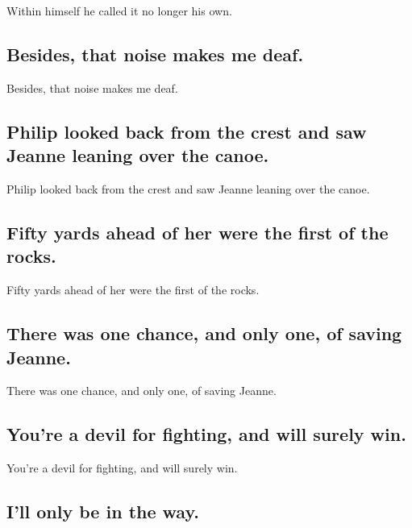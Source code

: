 \documentclass[]{article}
\begin{document}
Within himself he called it no longer his own.

\hypertarget{besides-that-noise-makes-me-deaf.}{%
\subsection{Besides, that noise makes me
deaf.}\label{besides-that-noise-makes-me-deaf.}}

Besides, that noise makes me deaf.

\hypertarget{philip-looked-back-from-the-crest-and-saw-jeanne-leaning-over-the-canoe.}{%
\subsection{Philip looked back from the crest and saw Jeanne leaning
over the
canoe.}\label{philip-looked-back-from-the-crest-and-saw-jeanne-leaning-over-the-canoe.}}

Philip looked back from the crest and saw Jeanne leaning over the canoe.

\hypertarget{fifty-yards-ahead-of-her-were-the-first-of-the-rocks.}{%
\subsection{Fifty yards ahead of her were the first of the
rocks.}\label{fifty-yards-ahead-of-her-were-the-first-of-the-rocks.}}

Fifty yards ahead of her were the first of the rocks.

\hypertarget{there-was-one-chance-and-only-one-of-saving-jeanne.}{%
\subsection{There was one chance, and only one, of saving
Jeanne.}\label{there-was-one-chance-and-only-one-of-saving-jeanne.}}

There was one chance, and only one, of saving Jeanne.

\hypertarget{youre-a-devil-for-fighting-and-will-surely-win.}{%
\subsection{You're a devil for fighting, and will surely
win.}\label{youre-a-devil-for-fighting-and-will-surely-win.}}

You're a devil for fighting, and will surely win.

\hypertarget{ill-only-be-in-the-way.}{%
\subsection{I'll only be in the way.}\label{ill-only-be-in-the-way.}}
\end{document}
